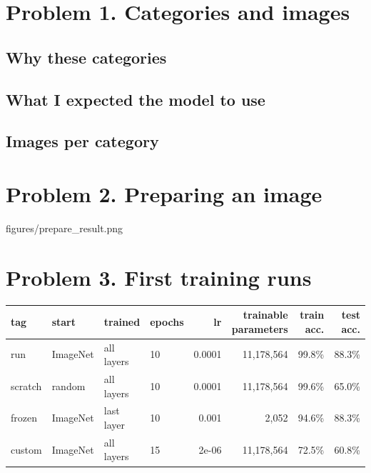 \documentclass[11pt]{article}
\begin{document}
\makeheader

\section*{Problem 1. Categories and images}

\subsection*{Why these categories}

\subsection*{What I expected the model to use}

\subsection*{Images per category}

\section*{Problem 2. Preparing an image}

           {figures/prepare_result.png}{}


\section*{Problem 3. First training runs}

\begin{center}\footnotesize
\begin{tabular}{llllrrrr}
\toprule
tag & start & trained & epochs & lr & trainable parameters & train acc. & test acc. \\
\midrule
run & ImageNet & all layers & 10 & 0.0001 & 11,178,564 & 99.8\% & 88.3\% \\
scratch & random & all layers & 10 & 0.0001 & 11,178,564 & 99.6\% & 65.0\% \\
frozen & ImageNet & last layer & 10 & 0.001 & 2,052 & 94.6\% & 88.3\% \\
custom & ImageNet & all layers & 15 & 2e-06 & 11,178,564 & 72.5\% & 60.8\% \\
\bottomrule
\end{tabular}
\end{center}
\end{document}
